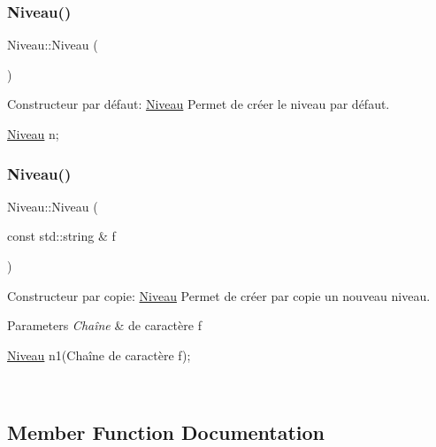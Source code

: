 \subsubsection{\texorpdfstring{Niveau()}{Niveau()}\hspace{0.1cm}{\footnotesize\ttfamily [1/2]}}
{\footnotesize\ttfamily Niveau\+::\+Niveau (\begin{DoxyParamCaption}{ }\end{DoxyParamCaption})}



Constructeur par défaut\+: \hyperlink{classNiveau}{Niveau} Permet de créer le niveau par défaut. 


\begin{DoxyCode}
\hyperlink{classNiveau}{Niveau} n;
\end{DoxyCode}
 \mbox{\label{classNiveau_a5f59a46da066f15b0c21154cbf583490}} 
\subsubsection{\texorpdfstring{Niveau()}{Niveau()}\hspace{0.1cm}{\footnotesize\ttfamily [2/2]}}
{\footnotesize\ttfamily Niveau\+::\+Niveau (\begin{DoxyParamCaption}\item[{const std\+::string \&}]{f }\end{DoxyParamCaption})}



Constructeur par copie\+: \hyperlink{classNiveau}{Niveau} Permet de créer par copie un nouveau niveau. 


\begin{DoxyParams}{Parameters}
{\em Chaîne} & de caractère f 
\begin{DoxyCode}
\hyperlink{classNiveau}{Niveau} n1(Chaîne de caractère f);
\end{DoxyCode}
 \\
\hline
\end{DoxyParams}


\subsection{Member Function Documentation}
\mbox{\label{classNiveau_a47ea8b8f36e27be8ad0d3f534a956260}} 
